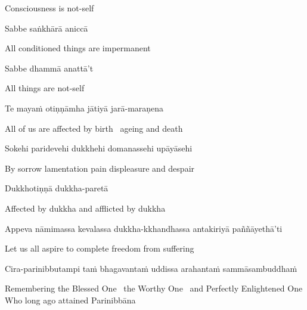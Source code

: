 \begin{english}
  Consciousness is not-self
\end{english}

Sabbe saṅkhārā aniccā

\begin{english}
  All conditioned things are impermanent
\end{english}

Sabbe dhammā anattā't

\begin{english}
  All things are not-self
\end{english}

Te mayaṁ otiṇṇāmha jātiyā jarā-maraṇena

\begin{english}
  All of us are affected by birth \breathmark\ ageing and death
\end{english}

Sokehi paridevehi dukkhehi domanassehi upāyāsehi

\begin{english}
  By sorrow lamentation pain displeasure
  and despair
\end{english}

Dukkhotiṇṇā dukkha-paretā

\begin{english}
  Affected by dukkha and afflicted by dukkha
\end{english}

Appeva nāmimassa kevalassa dukkha-kkhandhassa antakiriyā paññāyethā'ti

\begin{english}
  Let us all aspire to complete freedom from suffering
\end{english}

Cira-parinibbutampi taṁ bhagavantaṁ uddissa arahantaṁ sammāsambuddhaṁ

\begin{english}
  Remembering the Blessed One \breathmark\ the Worthy One \breathmark\ and Perfectly Enlightened One\\
  Who long ago attained Parinibbāna
\end{english}

